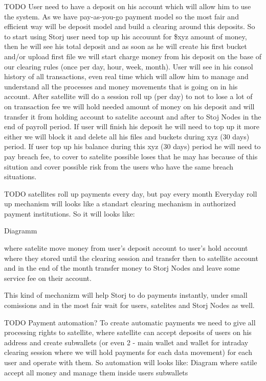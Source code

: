 \documentclass[11pt,fleqn,openany]{book}
\newcommand{\todo}[1]{{\color{red} TODO #1 }}
\begin{document}
\todo{
User need to have a deposit on his account which will allow him to use the system. As we have pay-as-you-go payment model so the most fair and efficient way will be deposit model and build a clearing  around this deposits.
So to start using Storj user need top up his accouunt for \$xyz amount of money, then he will see his total deposit and as soon as he will create his first bucket and/or upload first file we will start charge money from his deposit on the base of our clearing rules (once per day, hour, week, month). User will see in his consol history of all transactions, even real time which will allow him to manage and understand all the processes and money movements that is going on in his account.
After satellite will do a session roll up  (per day) to not to lose a lot of on transaction fee we will hold needed amount of money on his deposit and will transfer it from holding account to satelite account and after to Stoj Nodes in the end of payroll period.
If user will finish his deposit he will need to top up it more either we will block it and delete all his files and buckets during xyz (30 days) period. If user top up his balance during this xyz (30 days) period he will need to pay breach fee, to cover to satelite possible loses that he may has because of this sitution and cover possible risk from the users who have the same breach situations.

TODO satellites roll up payments every day, but pay every month
Everyday roll up mechanism will looks like a standart clearing mechanism in authorized payment institutions. So it will looks like:

Diagramm

where satelite move money from user's deposit account to user's hold account where they stored until the clearing session and transfer then to satellite account and in the end of the month transfer money to Storj Nodes and leave some service fee on their account.

This kind of mechanizm will help Storj to do payments instantly, under small comissions and in the most fair wait for users, satelites and Storj Nodes as well.


TODO Payment automation?
To create automatic payments we need to give all processing rights to satellite, where satellite can accept deposits of users on his address and create subwallets (or even 2 - main wallet and wallet for intraday clearing session where we will hold payments for each data movement) for each user and operate with them.
So automation will looks like:
Diagram where satile accept all money and manage them inside users subwallets
}
\end{document}
